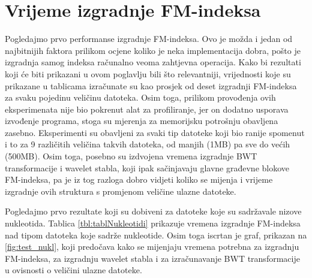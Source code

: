 \section{Vrijeme izgradnje FM-indeksa}
Pogledajmo prvo performanse izgradnje FM-indeksa. Ovo je možda i jedan od najbitnijih faktora prilikom ocjene koliko je neka implementacija dobra, pošto je izgradnja samog indeksa računalno veoma zahtjevna operacija. Kako bi rezultati koji će biti prikazani u ovom poglavlju bili što relevantniji, vrijednosti koje su prikazane u tablicama izračunate su kao prosjek od deset izgradnji FM-indeksa za svaku pojedinu veličinu datoteka. Osim toga, prilikom provođenja ovih eksperimenata nije bio pokrenut alat za profiliranje, jer on dodatno usporava izvođenje programa, stoga su mjerenja za memorijsku potrošnju obavljena zasebno. Eksperimenti su obavljeni za svaki tip datoteke koji bio ranije spomenut i to za 9 različitih veličina takvih datoteka, od manjih (1MB) pa sve do većih (500MB). Osim toga, posebno su izdvojena vremena izgradnje BWT transformacije i wavelet stabla, koji ipak sačinjavaju glavne građevne blokove FM-indeksa, pa je iz tog razloga dobro vidjeti koliko se mijenja i vrijeme izgradnje ovih struktura s promjenom veličine ulazne datoteke.

Pogledajmo prvo rezultate koji su dobiveni za datoteke koje su sadržavale nizove nukleotida. Tablica \ref{tbl:tablNukleotidi} prikazuje vremena izgradnje FM-indeksa nad tipom datoteka koje sadrže nukleotide. Osim toga iscrtan je graf, prikazan na \ref{fig:test_nukl}, koji predočava kako se mijenjaju vremena potrebna za izgradnju FM-indeksa, za izgradnju wavelet stabla i za izračunavanje BWT transformacije u ovisnosti o veličini ulazne datoteke.


